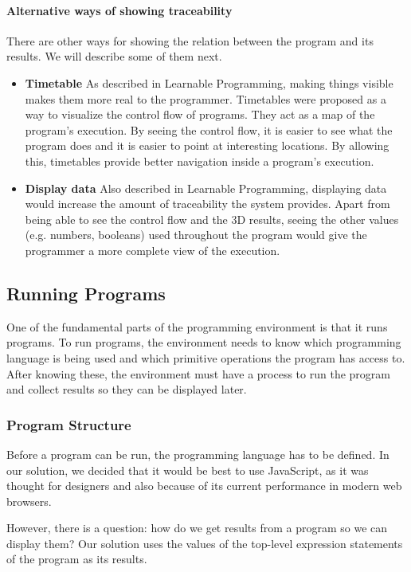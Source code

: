 \paragraph{Alternative ways of showing traceability}
There are other ways for showing the relation between the program and its results.
We will describe some of them next.
\begin{itemize}
  \item {\bf Timetable} As described in Learnable Programming\cite{victor2012learnable}, making things visible makes them more real to the programmer. Timetables were proposed as a way to visualize the control flow of programs. They act as a map of the program's execution. By seeing the control flow, it is easier to see what the program does and it is easier to point at interesting locations. By allowing this, timetables provide better navigation inside a program's execution.
  \item {\bf Display data} Also described in Learnable Programming\cite{victor2012learnable}, displaying data would increase the amount of traceability the system provides. Apart from being able to see the control flow and the 3D results, seeing the other values (e.g. numbers, booleans) used throughout the program would give the programmer a more complete view of the execution.
\end{itemize}


\subsection{Running Programs}
One of the fundamental parts of the programming environment is that it runs programs.
To run programs, the environment needs to know which programming language is being used and which primitive operations the program has access to.
After knowing these, the environment must have a process to run the program and collect results so they can be displayed later.


\subsubsection{Program Structure}
Before a program can be run, the programming language has to be defined.
In our solution, we decided that it would be best to use JavaScript, as it was thought for designers and also because of its current performance in modern web browsers.

However, there is a question: how do we get results from a program so we can display them?
Our solution uses the values of the top-level expression statements of the program as its results.

